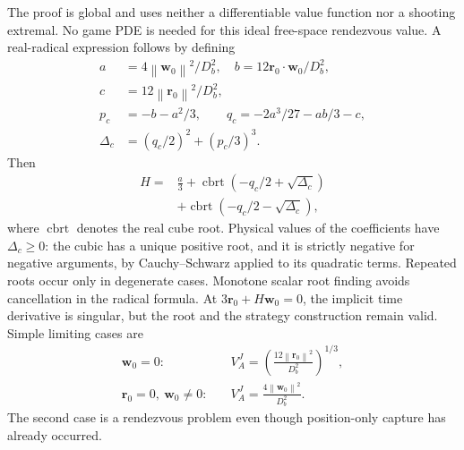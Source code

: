 \documentclass[journal,a4paper]{IEEEtran}
\newcommand{\norm}[1]{\left\|#1\right\|}
\begin{document}
The proof is global and uses neither a differentiable value function nor a shooting extremal. No game PDE is needed for this ideal free-space rendezvous value. A real-radical expression follows by defining
\begin{align}
 a&=4\norm{\mathbf w_0}^2/D_b^2,\quad
 b=12\mathbf r_0\cdot\mathbf w_0/D_b^2,\nonumber\\
 c&=12\norm{\mathbf r_0}^2/D_b^2,\nonumber\\
 p_c&=-b-a^2/3,\qquad q_c=-2a^3/27-ab/3-c,\nonumber\\
 \Delta_c&=(q_c/2)^2+(p_c/3)^3.
\end{align}
Then
\begin{equation}
\begin{split}
 H={}&\frac a3+\operatorname{cbrt}(-q_c/2+\sqrt{\Delta_c})\\
     &+\operatorname{cbrt}(-q_c/2-\sqrt{\Delta_c}),
\end{split}
 \label{eq:Jcardano}
\end{equation}
where $\operatorname{cbrt}$ denotes the real cube root. Physical values of the coefficients have $\Delta_c\ge0$: the cubic has a unique positive root, and it is strictly negative for negative arguments, by Cauchy--Schwarz applied to its quadratic terms. Repeated roots occur only in degenerate cases. Monotone scalar root finding avoids cancellation in the radical formula. At $3\mathbf r_0+H\mathbf w_0=0$, the implicit time derivative is singular, but the root and the strategy construction remain valid. Simple limiting cases are
\begin{align}
 \mathbf w_0=0:\quad &V_A^J=
 \left(\frac{12\norm{\mathbf r_0}^2}{D_b^2}\right)^{1/3},\label{eq:Jrest}\\
 \mathbf r_0=0,\ \mathbf w_0\ne0:\quad &V_A^J=
 \frac{4\norm{\mathbf w_0}^2}{D_b^2}.\label{eq:Jsameposition}
\end{align}
The second case is a rendezvous problem even though position-only capture has already occurred.
\end{document}
